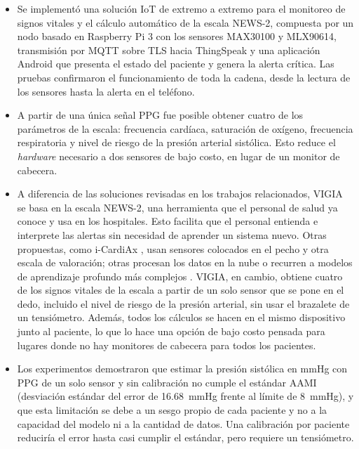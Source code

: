\documentclass[11pt,a4paper]{article}
\begin{document}
\begin{itemize}
    \item Se implementó una solución IoT de extremo a extremo para el monitoreo de signos vitales y el cálculo automático de la escala NEWS-2, compuesta por un nodo basado en Raspberry Pi 3 con los sensores MAX30100 y MLX90614, transmisión por MQTT sobre TLS hacia ThingSpeak y una aplicación Android que presenta el estado del paciente y genera la alerta crítica. Las pruebas confirmaron el funcionamiento de toda la cadena, desde la lectura de los sensores hasta la alerta en el teléfono.

    \item A partir de una única señal PPG fue posible obtener cuatro de los parámetros de la escala: frecuencia cardíaca, saturación de oxígeno, frecuencia respiratoria y nivel de riesgo de la presión arterial sistólica. Esto reduce el \textit{hardware} necesario a dos sensores de bajo costo, en lugar de un monitor de cabecera.

    \item A diferencia de las soluciones revisadas en los trabajos relacionados, VIGIA se basa en la escala NEWS-2, una herramienta que el personal de salud ya conoce y usa en los hospitales. Esto facilita que el personal entienda e interprete las alertas sin necesidad de aprender un sistema nuevo. Otras propuestas, como i-CardiAx \cite{ref17}, usan sensores colocados en el pecho y otra escala de valoración; otras procesan los datos en la nube \cite{ref18} o recurren a modelos de aprendizaje profundo más complejos \cite{ref20}. VIGIA, en cambio, obtiene cuatro de los signos vitales de la escala a partir de un solo sensor que se pone en el dedo, incluido el nivel de riesgo de la presión arterial, sin usar el brazalete de un tensiómetro. Además, todos los cálculos se hacen en el mismo dispositivo junto al paciente, lo que lo hace una opción de bajo costo pensada para lugares donde no hay monitores de cabecera para todos los pacientes.

    \item Los experimentos demostraron que estimar la presión sistólica en mmHg con PPG de un solo sensor y sin calibración no cumple el estándar AAMI (desviación estándar del error de 16.68~mmHg frente al límite de 8~mmHg), y que esta limitación se debe a un sesgo propio de cada paciente y no a la capacidad del modelo ni a la cantidad de datos. Una calibración por paciente reduciría el error hasta casi cumplir el estándar, pero requiere un tensiómetro.


\end{itemize}
\end{document}
